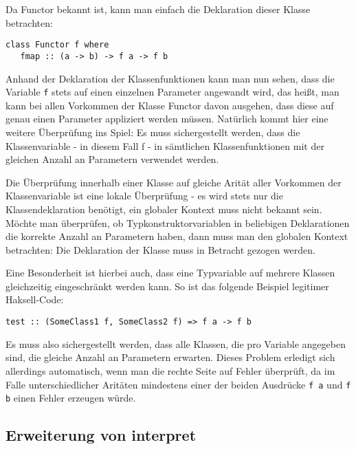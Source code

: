 Da Functor bekannt ist, kann man einfach die Deklaration dieser Klasse betrachten:

\begin{verbatim}
class Functor f where
   fmap :: (a -> b) -> f a -> f b
\end{verbatim}

Anhand der Deklaration der Klassenfunktionen kann man nun sehen, dass die Variable \texttt{f} stets auf einen einzelnen 
Parameter angewandt wird, das heißt, man kann bei allen Vorkommen der Klasse Functor davon ausgehen, dass diese
auf genau einen Parameter appliziert werden müssen. Natürlich kommt hier eine weitere Überprüfung ins Spiel: Es muss
sichergestellt werden, dass die Klassenvariable - in diesem Fall f - in sämtlichen Klassenfunktionen mit der gleichen Anzahl an
Parametern verwendet werden.

Die Überprüfung innerhalb einer Klasse auf gleiche Arität aller Vorkommen der Klassenvariable ist eine lokale Überprüfung -
es wird stets nur die Klassendeklaration benötigt, ein globaler Kontext muss nicht bekannt sein. Möchte man überprüfen,
ob Typkonstruktorvariablen in beliebigen Deklarationen die korrekte Anzahl an Parametern haben, dann muss man den
globalen Kontext betrachten: Die Deklaration der Klasse muss in Betracht gezogen werden.

Eine Besonderheit ist hierbei auch, dass eine Typvariable auf mehrere Klassen gleichzeitig eingeschränkt werden kann. So ist
das folgende Beispiel legitimer Haksell-Code:

\begin{verbatim}
test :: (SomeClass1 f, SomeClass2 f) => f a -> f b
\end{verbatim}


Es muss also sichergestellt werden, dass alle Klassen, die pro Variable angegeben sind, die gleiche Anzahl an Parametern erwarten.
Dieses Problem erledigt sich allerdings automatisch, wenn man die rechte Seite auf Fehler überprüft, da im Falle unterschiedlicher
Aritäten mindestens einer der beiden Ausdrücke \texttt{f a} und \texttt{f b} einen Fehler erzeugen würde.


\subsection{Erweiterung von interpret}

